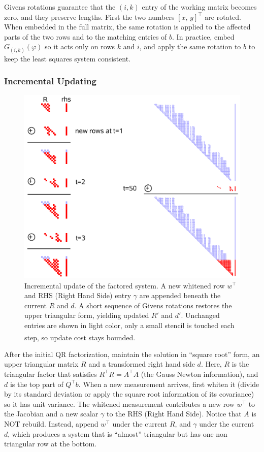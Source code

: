 Givens rotations guarantee that the $(i,k)$ entry of the working matrix becomes zero, and they preserve lengths. First the two numbers $[x,\,y]^\top$ are rotated. When embedded in the full matrix, the same rotation is applied to the affected parts of the two rows and to the matching entries of $b$. In practice, embed $G_{(i,k)}(\varphi)$ so it acts only on rows $k$ and $i$, and apply the same rotation to $b$ to keep the least squares system consistent.



\subsubsection{Incremental Updating}
\begin{figure}[H]
    \centering
    \includegraphics[width=0.5\linewidth]{Pictures/Optimizers/iSAM/R_Matrix_Update_Step.png}
    \caption{Incremental update of the factored system. A new whitened row $w^\top$ and RHS (Right Hand Side) entry $\gamma$ are appended beneath the current $R$ and $d$. A short sequence of Givens rotations restores the upper triangular form, yielding updated $R'$ and $d'$. Unchanged entries are shown in light color, only a small stencil is touched each step, so update cost stays bounded.\textsuperscript{\cite{iSAM_paper}}}
    \label{fig:R-matrix-update-step}
\end{figure}
\noindent
After the initial QR factorization, maintain the solution in ``square root'' form, an upper triangular matrix $R$ and a transformed right hand side $d$. Here, $R$ is the triangular factor that satisfies $R^\top R = A^\top A$ (the Gauss Newton information), and $d$ is the top part of $Q^\top b$. When a new measurement arrives, first whiten it (divide by its standard deviation or apply the square root information of its covariance) so it has unit variance. The whitened measurement contributes a new row $w^\top$ to the Jacobian and a new scalar $\gamma$ to the RHS (Right Hand Side). Notice that $A$ is NOT rebuild. Instead, append $w^\top$ under the current $R$, and $\gamma$ under the current $d$, which produces a system that is ``almost'' triangular but has one non triangular row at the bottom.

